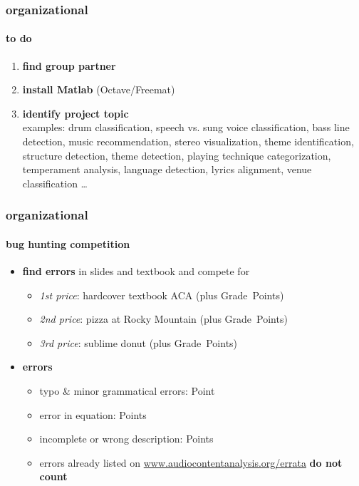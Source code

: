         \begin{frame}\frametitle{organizational}\framesubtitle{to do}
            \begin{enumerate}
                \item   \textbf{find group partner}
            
                \smallskip
                \item<2->   \textbf{install Matlab} (Octave/Freemat)
            
                \smallskip
                \item<3->   \textbf{identify project topic}\\ examples: drum classification, speech vs. sung voice classification, bass line detection, music recommendation, stereo visualization, theme identification, structure detection, theme detection, playing technique categorization, temperament analysis, language detection, lyrics alignment, venue classification \ldots
            \end{enumerate}
        \end{frame}

        \begin{frame}\frametitle{organizational}\framesubtitle{bug hunting competition}
            \begin{itemize}
                \item   \textbf{find errors} in slides and textbook and compete for
                    \begin{itemize}
                        \item   \textit{1st price}: hardcover textbook ACA (plus \unit[3]{Grade Points})
                        \item   \textit{2nd price}: pizza at Rocky Mountain (plus \unit[2]{Grade Points})
                        \item   \textit{3rd price}: sublime donut (plus \unit[1]{Grade Points})
                    \end{itemize}
                
                \smallskip
                \item<2-> \textbf{errors}
                    \begin{itemize}
                        \item   typo \& minor grammatical errors: \unit[1]{Point}
                        \item   error in equation: \unit[2]{Points}
                        \item   incomplete or wrong description: \unit[3]{Points}
                        \item   errors already listed on \url{www.audiocontentanalysis.org/errata} \textbf{do not count}
                    \end{itemize}
            \end{itemize}
        \end{frame}




